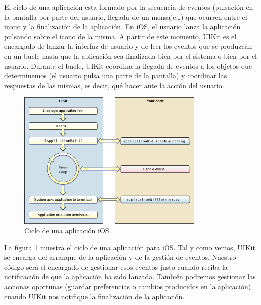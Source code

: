 	El ciclo %
	de una aplicación esta formado por la secuencia de eventos (pulsación en la pantalla por parte del usuario, llegada de un mensaje\ldots ) %
	 que ocurren entre el inicio %
	 y la finalización de la aplicación. En iOS, el usuario lanza la aplicación pulsando sobre el icono de la misma.  A partir de este momento, UIKit es el encargado de lanzar la interfaz de usuario y de leer los eventos que se produzcan en un bucle hasta que la aplicación sea finalizada bien por el sistema o bien por el usuario. Durante el bucle, UIKit coordina la llegada de eventos a los objetos que determinemos (el usuario pulsa una parte de la pantalla) %
	 y coordinar las respuestas %
	 de las mismas, es decir, qué hacer ante la acción del usuario. 
	     
 \begin{figure} [h]
  \centering
    \includegraphics[width=0.8\textwidth]{./images/app_life_cycle.jpg}
  \caption{Ciclo de una aplicación iOS }
  \label{fig:iOS-layers}
\end{figure}
     
   La figura \ref{fig:iOS-layers} %
    muestra el ciclo de una aplicación para iOS. Tal y como vemos, UIKit se encarga del arranque de la aplicación y de la gestión de eventos. Nuestro código será el encargado de gestionar esos eventos justo cuando reciba la notificación de que la aplicación ha sido lanzada. También podremos gestionar las accionas oportunas (guardar preferencias o cambios producidos en la aplicación) cuando UIKit nos notifique la finalización de la aplicación.
   
